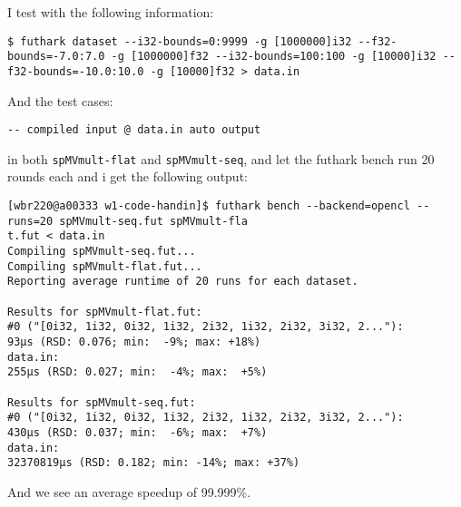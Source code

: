 \documentclass[11pt]{article}
\begin{document}
I test with the following information:
\begin{verbatim}
$ futhark dataset --i32-bounds=0:9999 -g [1000000]i32 --f32-bounds=-7.0:7.0 -g [1000000]f32 --i32-bounds=100:100 -g [10000]i32 --f32-bounds=-10.0:10.0 -g [10000]f32 > data.in
\end{verbatim}
And the test cases:
\begin{verbatim}
-- compiled input @ data.in auto output
\end{verbatim}
in both \texttt{spMVmult-flat} and \texttt{spMVmult-seq}, and let the futhark bench run 20 rounds each and i get 
the following output:
\begin{verbatim}
[wbr220@a00333 w1-code-handin]$ futhark bench --backend=opencl --runs=20 spMVmult-seq.fut spMVmult-fla
t.fut < data.in
Compiling spMVmult-seq.fut...
Compiling spMVmult-flat.fut...
Reporting average runtime of 20 runs for each dataset.

Results for spMVmult-flat.fut:
#0 ("[0i32, 1i32, 0i32, 1i32, 2i32, 1i32, 2i32, 3i32, 2..."):         93μs (RSD: 0.076; min:  -9%; max: +18%)
data.in:                                                             255μs (RSD: 0.027; min:  -4%; max:  +5%)

Results for spMVmult-seq.fut:
#0 ("[0i32, 1i32, 0i32, 1i32, 2i32, 1i32, 2i32, 3i32, 2..."):        430μs (RSD: 0.037; min:  -6%; max:  +7%)
data.in:                                                        32370819μs (RSD: 0.182; min: -14%; max: +37%)
\end{verbatim}
And we see an average speedup of 99.999\%.
\end{document}
